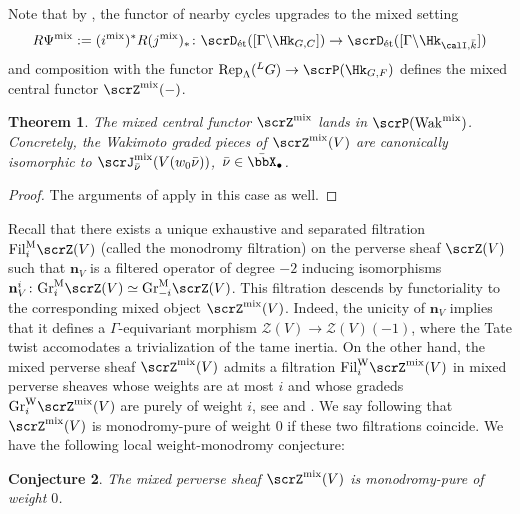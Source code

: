 \documentclass[10pt, reqno]{amsart}
\theoremstyle{plain}
\newtheorem{theorem}{Theorem}[section]
\newtheorem{conjecture}[theorem]{Conjecture}
\theoremstyle{definition}
\numberwithin{equation}{section}
\begin{document}
	Note that by \cite[Section 8]{AGLR22}, the functor of nearby cycles upgrades to the mixed setting
	\begin{equation}
		R\Psi^{\mathrm{mix}}:=(i^{\mathrm{mix}})^\ast R(j^{\mathrm{mix}})_\ast \colon \scrD_{\mathrm{\acute{e}t}}([\Gamma \backslash\Hk_{G,C}]) \to  \scrD_{\mathrm{\acute{e}t}}([\Gamma \backslash\Hk_{\calI,\bar k}]) 
	\end{equation}
	and composition with the functor $\mathrm{Rep}_\Lambda(^LG)\to \scrP(\Hk_{G,F})$ defines the mixed central functor $\scrZ^{\mathrm{mix}}(-)$. 
	\begin{theorem}
		The mixed central functor $\scrZ^{\mathrm{mix}}$ lands in $\scrP(\mathrm{Wak}^{\mathrm{mix}})$. Concretely, the Wakimoto graded pieces of $\scrZ^{\mathrm{mix}}(V)$ are canonically isomorphic to $\scrJ_{\bar \nu}^{\mathrm{mix}}(V(w_0 \bar \nu))$,\ $\bar \nu\in \bar \bbX_{\bullet}$.
	\end{theorem} 
	
	\begin{proof}
		The arguments of  apply in this case as well.
	\end{proof}
	
	Recall that there exists a unique exhaustive and separated filtration $\mathrm{Fil}_{i}^{\mathrm{M}}\scrZ(V)$ (called the monodromy filtration) on the perverse sheaf $\scrZ(V)$ such that $\mathbf{n}_V$ is a filtered operator of degree $-2$ inducing isomorphisms $\mathbf{n}_V^i \colon \mathrm{Gr}_{i}^{\mathrm{M}}\scrZ(V) \simeq \mathrm{Gr}_{-i}^{\mathrm{M}}\scrZ(V) $.
	This filtration descends by functoriality to the corresponding mixed object $\scrZ^{\mathrm{mix}}(V)$. Indeed, the unicity of $\mathbf{n}_V$ implies that it defines a $\Gamma$-equivariant morphism $\mathcal{Z}(V)\to \mathcal{Z}(V)(-1)$, where the Tate twist accomodates a trivialization of the tame inertia.
	On the other hand, the mixed perverse sheaf $\scrZ^{\mathrm{mix}}(V)$ admits a filtration $\mathrm{Fil}_{i}^{\mathrm{W}}\scrZ^{\mathrm{mix}}(V) $ in mixed perverse sheaves whose weights are at most $i$ and whose gradeds $\mathrm{Gr}_{i}^{\mathrm{W}}\scrZ^{\mathrm{mix}}(V)$ are purely of weight $i$, see \cite[Théorème 5.3.5]{BBDG18} and \cite[Theorem 2.6.8]{HZ23}. We say following \cite{HZ23} that $\scrZ^{\mathrm{mix}}(V)$ is monodromy-pure of weight $0$ if these two filtrations coincide. We have the following local weight-monodromy conjecture:
	
	\begin{conjecture}\label{wt_monodr_conjecture}
		The mixed perverse sheaf $\scrZ^{\mathrm{mix}}(V)$ is monodromy-pure of weight $0$.
	\end{conjecture}
	
\end{document}
